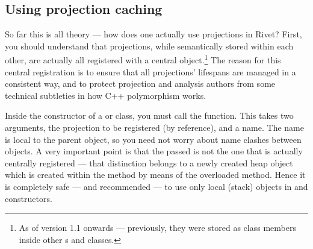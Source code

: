 \documentclass{JHEP3}
\begin{document}
\subsection{Using projection caching}
So far this is all theory --- how does one actually use projections in Rivet?
First, you should understand that projections, while semantically stored within
each other, are actually all registered with a central 
object.\footnote{As of version 1.1 onwards --- previously, they were stored as
  class members inside other s and  classes.}
The reason for this central registration is to ensure that all projections'
lifespans are managed in a consistent way, and to protect projection and
analysis authors from some technical subtleties in how C++ polymorphism works.

Inside the constructor of a  or  class, you must
call the  function. This takes two arguments, the projection
to be registered (by  reference), and a name. The name is local to
the parent object, so you need not worry about name clashes between objects. A
very important point is that the passed  is not the one that is
actually centrally registered --- that distinction belongs to a newly created
heap object which is created within the  method by means of
the overloaded  method. Hence it is completely safe
--- and recommended --- to use only local (stack) objects in 
and  constructors.
\end{document}
